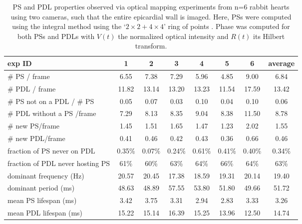\documentclass[aps,pre,amsfonts,amssymb,amsmath,twocolumn, superscriptaddress]{revtex4-1}
\begin{document}
\begin{table*}[htp]
    \centering
 \begin{tabular}{l | c c c c c c| c }
 exp ID & 1& 2& 3&4 &5 &6 & average \\ \hline
 \# PS / frame & 6.55 & 7.38 & 7.29 & 5.96 & 4.85 & 9.00 & 6.84 \\ 
 \# PDL / frame& 11.82 & 13.14 & 13.20 & 13.23 & 11.54 & 17.59 & 13.42 \\
\# PS not on a PDL / \# PS & 0.05 & 0.07 & 0.03 & 0.10 & 0.04 & 0.10 & 0.06 \\ 
 \# PDL without a PS /frame  & 7.29 & 8.13 & 8.35 & 9.04 & 8.38 & 11.50 & 8.78 \\ 
\# new PS/frame & 1.45 & 1.51 & 1.65 & 1.47 & 1.23 & 2.02 & 1.55 \\ 
\# new PDL/frame & 0.41 & 0.46 & 0.42 & 0.43 & 0.36 & 0.66 & 0.46 \\ \hline
fraction of PS never on PDL & 0.35\% & 0.07\% & 0.24\% & 0.61\% & 0.41\% & 0.40\% & 0.34\% \\ 
fraction of PDL never hosting PS & 61\% & 60\% & 63\% & 64\% & 66\% & 64\% & 63\%\\ \hline
dominant frequency (Hz) & 20.57 & 20.45 & 17.38 & 18.59 & 19.31 & 20.14 & 19.40\\ 
dominant period (ms) & 48.63 & 48.89 & 57.55 & 53.80 & 51.80 & 49.66 & 51.72 \\ 
mean PS lifespan (ms) & 3.42 & 3.75 & 3.31 & 2.94 & 2.83 & 3.33 & 3.26 \\ 
mean PDL lifespan (ms) & 15.22 & 15.14 & 16.39 & 15.25 & 13.96 & 12.50 & 14.74 \\
 \end{tabular}
     \caption{PS and PDL properties observed via optical mapping experiments from n=6 rabbit hearts using two cameras, such that the entire epicardial wall is imaged. Here, PSs were computed using the integral method using the `$2\times2+4\times4$' ring of points \citep{Kuklik:2017}. Phase was computed for both PSs and PDLs with $V(t)$ the normalized optical intensity and $R(t)$ its Hilbert transform.}
    \label{tab:stats}
\end{table*}
\end{document}
